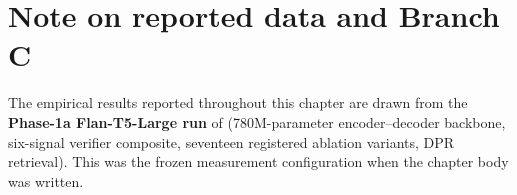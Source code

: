 %
%

\section*{Note on reported data and Branch C}
\label{sec:branch-c-transition-note}

The empirical results reported throughout this chapter are drawn from
the \textbf{Phase-1a Flan-T5-Large run} of \caem{} (780M-parameter
encoder--decoder backbone, six-signal verifier composite, seventeen
registered ablation variants, DPR retrieval). This was the frozen
measurement configuration when the chapter body was written.

